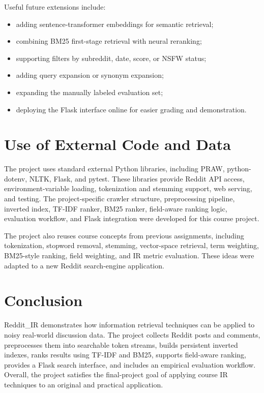 \documentclass[11pt]{article}
\begin{document}
Useful future extensions include:

\begin{itemize}
    \item adding sentence-transformer embeddings for semantic retrieval;
    \item combining BM25 first-stage retrieval with neural reranking;
    \item supporting filters by subreddit, date, score, or NSFW status;
    \item adding query expansion or synonym expansion;
    \item expanding the manually labeled evaluation set;
    \item deploying the Flask interface online for easier grading and demonstration.
\end{itemize}

\section{Use of External Code and Data}
The project uses standard external Python libraries, including PRAW, python-dotenv, NLTK, Flask, and pytest. These libraries provide Reddit API access, environment-variable loading, tokenization and stemming support, web serving, and testing. The project-specific crawler structure, preprocessing pipeline, inverted index, TF-IDF ranker, BM25 ranker, field-aware ranking logic, evaluation workflow, and Flask integration were developed for this course project.

The project also reuses course concepts from previous assignments, including tokenization, stopword removal, stemming, vector-space retrieval, term weighting, BM25-style ranking, field weighting, and IR metric evaluation. These ideas were adapted to a new Reddit search-engine application.

\section{Conclusion}
Reddit\_IR demonstrates how information retrieval techniques can be applied to noisy real-world discussion data. The project collects Reddit posts and comments, preprocesses them into searchable token streams, builds persistent inverted indexes, ranks results using TF-IDF and BM25, supports field-aware ranking, provides a Flask search interface, and includes an empirical evaluation workflow. Overall, the project satisfies the final-project goal of applying course IR techniques to an original and practical application.
\end{document}
